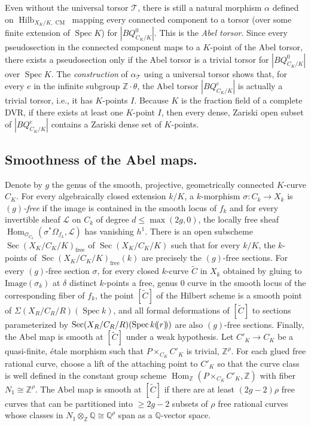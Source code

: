 \documentclass[11pt]{article}
\theoremstyle{definition}
\numberwithin{equation}{section}
\numberwithin{figure}{section}
\numberwithin{table}{section}
\newcommand{\mbb}{\mathbb}
\newcommand{\QQ}{\mbb{Q}}
\newcommand{\ZZ}{\mbb{Z}}
\newcommand{\mc}{\mathcal}
\newcommand{\mcL}{\mc{L}}
\newcommand{\mcT}{\mc{T}}
\newcommand{\OO}{\mc{O}}
\newcommand{\wt}{\widetilde}
\newcommand{\Xx}{X}
\newcommand{\Cc}{C}
\newcommand{\Rr}{R}
\newcommand{\FR}{K}
\DeclareMathOperator{\SP}{Spec}
\DeclareMathOperator{\Hilb}{Hilb}
\DeclareMathOperator{\Sec}{Sec}
\DeclareMathOperator{\cm}{CM}
\DeclareMathOperator{\Hom}{Hom}
\newcommand{\llpar}{\mathopen{(\mkern -3.7mu(}}
\newcommand{\rrpar}{\mathclose{)\mkern -3.7mu)}}
\begin{document}
Even without the universal torsor $\mcT$, there is still a natural morphism $\alpha$ defined on $\Hilb_{\Xx_\FR/\FR,\cm}$ mapping every connected component to a torsor (over some finite extension of $\SP \FR$) for $|BQ^0_{\Cc_\FR/\FR}|$. This is the \emph{Abel torsor}. Since every pseudosection in the connected component maps to a $\FR$-point of the Abel torsor, there exists a pseudosection only if the Abel torsor is a trivial torsor for $|BQ^0_{\Cc_\FR/\FR}|$ over $\SP \FR$. The \emph{construction} of $\alpha_\mcT$ using a universal torsor shows that, for every $e$ in the infinite subgroup $\ZZ\cdot \theta$, the Abel torsor $|BQ^e_{\Cc_\FR/\FR}|$ is actually a trivial torsor, i.e., it has $\FR$-points $I$. Because $\FR$ is the fraction field of a complete DVR, if there exists at least one $\FR$-point $I$, then every dense, Zariski open subset of $|BQ^e_{\Cc_\FR/\FR}|$ contains a Zariski dense set of $\FR$-points.

\subsection{Smoothness of the Abel maps.} \label{subsec-Abelsmooth}
Denote by $g$ the genus of the smooth, projective, geometrically connected $\FR$-curve $\Cc_\FR$. For every algebraically closed extension $k/\FR$, a $k$-morphism $\sigma:\Cc_k\to \Xx_k$ is
\emph{$(g)$-free} if the image is contained in the smooth locus of $f_k$ and for every invertible sheaf $\mcL$ on $\Cc_k$ of degree $d\leq \max(2g,0)$, the locally free sheaf $\Hom_{\OO_{\Cc_k}}(\sigma^*\Omega_{f_k},\mcL)$ has vanishing $h^1$. There is an open subscheme $\Sec(\Xx_\FR/\Cc_\FR/\FR)_{\text{free}}$ of $\Sec(\Xx_\FR/\Cc_\FR/\FR)$ such that for every $k/\FR$, the $k$-points of $\Sec(\Xx_\FR/\Cc_\FR/\FR)_{\text{free}}(k)$ are precisely the $(g)$-free sections. For every $(g)$-free section $\sigma$, for every closed $k$-curve $\wt{\Cc}$ in $\Xx_k$ obtained by gluing to $\text{Image}(\sigma_k)$ at $\delta$ distinct $k$-points a free, genus $0$ curve in the smooth locus of the corresponding fiber of $f_k$, the point $[\wt{\Cc}]$ of the Hilbert scheme is a smooth point of $\Sigma(\Xx_\Rr/\Cc_\Rr/\Rr)(\SP k)$, and all formal deformations of $[\wt{\Cc}]$ to sections parameterized by $\Sec(\Xx_\Rr/\Cc_\Rr/\Rr)(\SP k\llpar r\rrpar)$ are also $(g)$-free sections. Finally, the Abel map is smooth at $[\wt{\Cc}]$ under a weak hypothesis. Let $\Cc'_\FR\to \Cc_\FR$ be a quasi-finite, étale morphism such that $P\times_{\Cc_\FR}\Cc'_\FR$ is trivial, $\ZZ^\rho$. For each glued free rational curve, choose a lift of the attaching point to $\Cc'_\FR$ so that the curve class is well defined in the constant group scheme $\Hom_{\ZZ}(P\times_{\Cc_\FR}\Cc'_\FR,\ZZ)$ with fiber $N_1 \cong
\ZZ^\rho$. The Abel map is smooth at $[\wt{\Cc}]$ if there are at least $(2g-2)\rho$ free curves that can be partitioned into $\geq 2g-2$ subsets of $\rho$ free rational curves whose classes in $N_1\otimes_{\ZZ}\QQ \cong
\QQ^\rho$ span as a $\QQ$-vector space.
\end{document}
